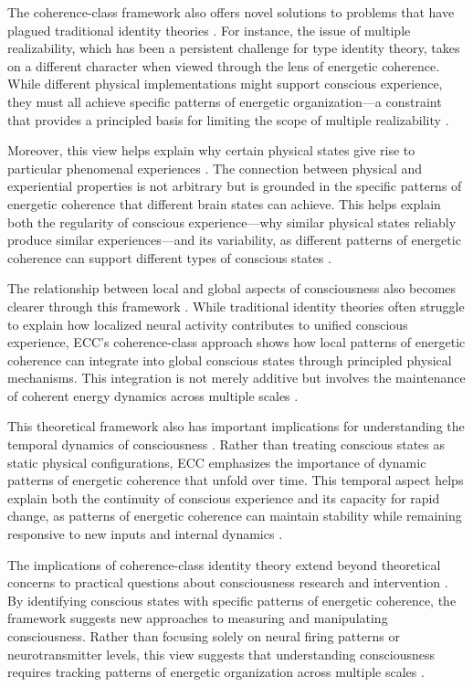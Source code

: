 The coherence-class framework also offers novel solutions to problems that have plagued traditional identity theories \cite{shapiro2000multiple}. For instance, the issue of multiple realizability, which has been a persistent challenge for type identity theory, takes on a different character when viewed through the lens of energetic coherence. While different physical implementations might support conscious experience, they must all achieve specific patterns of energetic organization—a constraint that provides a principled basis for limiting the scope of multiple realizability \cite{bechtel1999multiple}.

Moreover, this view helps explain why certain physical states give rise to particular phenomenal experiences \cite{kim1992multiple}. The connection between physical and experiential properties is not arbitrary but is grounded in the specific patterns of energetic coherence that different brain states can achieve. This helps explain both the regularity of conscious experience—why similar physical states reliably produce similar experiences—and its variability, as different patterns of energetic coherence can support different types of conscious states \cite{richardson2008multiple}.

The relationship between local and global aspects of consciousness also becomes clearer through this framework \cite{wilson2001two}. While traditional identity theories often struggle to explain how localized neural activity contributes to unified conscious experience, ECC's coherence-class approach shows how local patterns of energetic coherence can integrate into global conscious states through principled physical mechanisms. This integration is not merely additive but involves the maintenance of coherent energy dynamics across multiple scales \cite{polger2009evaluating}.

This theoretical framework also has important implications for understanding the temporal dynamics of consciousness \cite{craver2007explaining}. Rather than treating conscious states as static physical configurations, ECC emphasizes the importance of dynamic patterns of energetic coherence that unfold over time. This temporal aspect helps explain both the continuity of conscious experience and its capacity for rapid change, as patterns of energetic coherence can maintain stability while remaining responsive to new inputs and internal dynamics \cite{feigl1967mental}.

The implications of coherence-class identity theory extend beyond theoretical concerns to practical questions about consciousness research and intervention \cite{richardson2008multiple}. By identifying conscious states with specific patterns of energetic coherence, the framework suggests new approaches to measuring and manipulating consciousness. Rather than focusing solely on neural firing patterns or neurotransmitter levels, this view suggests that understanding consciousness requires tracking patterns of energetic organization across multiple scales \cite{bechtel1999multiple}.

